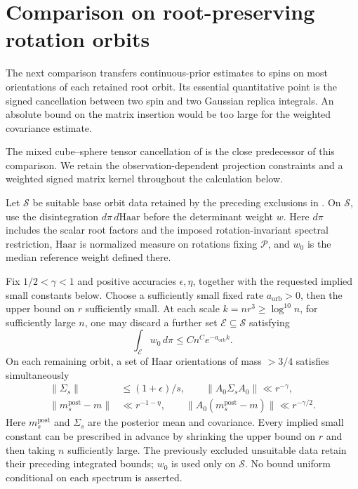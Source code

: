 \section{Comparison on root-preserving rotation orbits}\label{prof:local}

The next comparison transfers continuous-prior estimates to spins on
most orientations of each retained root orbit. Its essential quantitative
point is the signed cancellation between two spin and two Gaussian
replica integrals. An absolute bound on the matrix insertion would be too
large for the weighted covariance estimate.

The mixed cube--sphere tensor cancellation of
\citet[Lemma~3.5]{DuHuang2026CriticalOverlap} is the close predecessor of
this comparison. We retain the observation-dependent projection constraints
and a weighted signed matrix kernel throughout the calculation below.

\begin{proposition}
\label{prof:median-covariance}
Let $\mathcal S$ be suitable base orbit data retained by the preceding
exclusions in . On $\mathcal S$, use the disintegration
$d\pi\,d\mathrm{Haar}$ before the determinant weight $w$.
Here $d\pi$ includes the scalar root factors and the imposed
rotation-invariant spectral restriction, $\mathrm{Haar}$ is normalized
measure on rotations fixing $\mathcal P$, and $w_0$ is the median
reference weight defined there.

Fix $1/2<\gamma<1$ and positive accuracies $\epsilon,\eta$, together
with the requested implied small constants below. Choose a sufficiently
small fixed rate $a_{\mathrm{orb}}>0$, then the upper bound on $r$
sufficiently small. At each scale $k=nr^3\ge\log^{10}n$, for sufficiently
large $n$, one may discard a further set $\mathcal E\subseteq\mathcal S$
satisfying
\[
 \int_{\mathcal E}w_0\,d\pi\le Cn^C e^{-a_{\mathrm{orb}}k}.
\]
On each remaining orbit, a set of Haar orientations of mass $>3/4$
satisfies simultaneously
\begin{equation}\label{prof:eq13}
\begin{split}
 \|\Sigma_s\|&\le (1+\epsilon)/s,\qquad
 \|A_0 \Sigma_s A_0\|\ll r^{-\gamma},\\
 \|m_s^{\mathrm{post}}-m\|&\ll r^{-1-\eta},\qquad
 \|A_0(m_s^{\mathrm{post}}-m)\|\ll r^{-\gamma/2}.
 \end{split}
\end{equation}
Here $m_s^{\mathrm{post}}$ and $\Sigma_s$ are the posterior mean and
covariance. Every implied small constant can be prescribed in advance by
shrinking the upper bound on $r$ and then taking $n$ sufficiently large.
The previously excluded unsuitable data retain their preceding
integrated bounds; $w_0$ is used only on $\mathcal S$. No bound uniform
conditional on each spectrum is asserted.
\end{proposition}

